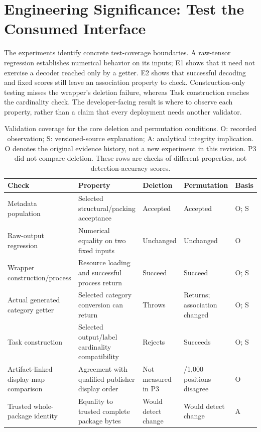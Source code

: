 \documentclass[10pt,conference]{IEEEtran}
\begin{document}
\section{Engineering Significance: Test the Consumed Interface}
\label{sec:discussion}
The experiments identify concrete test-coverage boundaries. A raw-tensor regression establishes numerical behavior on its inputs; E1 shows that it need not exercise a decoder reached only by a getter. E2 shows that successful decoding and fixed scores still leave an association property to check. Construction-only testing misses the wrapper's deletion failure, whereas Task construction reaches the cardinality check. The developer-facing result is where to observe each property, rather than a claim that every deployment needs another validator.

\begin{table}[t]
\caption{Validation coverage for the core deletion and permutation conditions. O: recorded observation; S: versioned-source explanation; A: analytical integrity implication. O denotes the original evidence history, not a new experiment in this revision. P3 did not compare deletion. These rows are checks of different properties, not detection-accuracy scores.}
\label{tab:coverage}
\centering\small
\begin{tabularx}{\textwidth}{@{}>{\raggedright\arraybackslash}p{}>{\raggedright\arraybackslash}p{}>{\raggedright\arraybackslash}X>{\raggedright\arraybackslash}X>{\raggedright\arraybackslash}p{}@{}}
\toprule
Check & Property & Deletion & Permutation & Basis\\
\midrule
Metadata population & Selected structural/packing acceptance & Accepted & Accepted & O; S\\
Raw-output regression & Numerical equality on two fixed inputs & Unchanged & Unchanged & O\\
Wrapper construction/process & Resource loading and successful process return & Succeed & Succeed & O; S\\
Actual generated category getter & Selected category conversion can return & Throws & Returns; association changed & O; S\\
Task construction & Selected output/label cardinality compatibility & Rejects & Succeeds & O; S\\
Artifact-linked display-map comparison & Agreement with qualified publisher display order & Not measured in P3 & 999/1,000 positions disagree & O\\
Trusted whole-package identity & Equality to trusted complete package bytes & Would detect change & Would detect change & A\\
\bottomrule
\end{tabularx}
\end{table}
\end{document}
